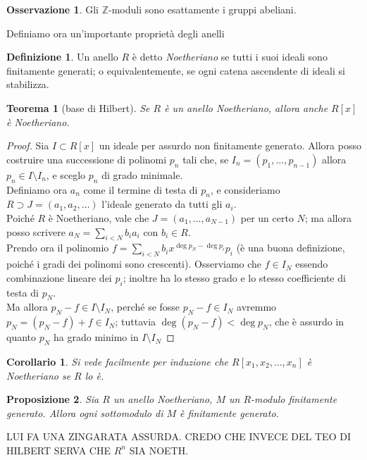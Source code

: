 \documentclass[11pt]{article}
\theoremstyle{plain}
\newtheorem{thm}{Teorema}[section]
\newtheorem{prop}[thm]{Proposizione}
\newtheorem*{cor}{Corollario}
\theoremstyle{definition}
\newtheorem{defn}{Definizione}[section]
\newtheorem*{rem}{Osservazione}
\theoremstyle{remark}
\newcommand{\Z}{\mathbb{Z}}
\begin{document}
  \begin{rem}
   Gli $\Z$-moduli sono esattamente i gruppi abeliani.
  \end{rem}
  Definiamo ora un'importante proprietà degli anelli
  \begin{defn}
   Un anello $R$ è detto \textit{Noetheriano} se tutti i suoi ideali sono finitamente generati; o equivalentemente, se ogni catena ascendente di ideali si stabilizza.
  \end{defn}
  \begin{thm}[base di Hilbert]
   Se $R$ è un anello Noetheriano, allora anche $R[x]$ è Noetheriano.
  \end{thm}
  \begin{proof}
   Sia $I\subset R[x]$ un ideale per assurdo non finitamente generato. Allora posso costruire una successione di polinomi $p_n$ tali che, se $I_n=(p_1,\dots,p_{n-1})$ allora $p_n\in I\setminus I_n$, e sceglo $p_n$ di grado minimale.\\
   Definiamo ora $a_n$ come il termine di testa di $p_n$, e consideriamo $R\supset J=(a_1,a_2,\dots)$ l'ideale generato da tutti gli $a_i$.\\
   Poiché $R$ è Noetheriano, vale che $J=(a_1,\dots,a_{N-1})$ per un certo $N$; ma allora posso scrivere $a_N=\sum_{i<N}b_ia_i$ con $b_i\in R$.\\
   Prendo ora il polinomio $\displaystyle f=\sum_{i<N}b_i x^{\deg p_N -\deg p_i}p_i$ (è una buona definizione, poiché i gradi dei polinomi sono crescenti).
   Osserviamo che $f\in I_N$ essendo combinazione lineare dei $p_i$; inoltre ha lo stesso grado e lo stesso coefficiente di testa di $p_N$.\\
   Ma allora $p_N-f\in I\setminus I_N$, perché se fosse $p_N-f\in I_N$ avremmo $p_N=(p_N-f)+f\in I_N$; tuttavia $\deg (p_N-f)<\deg p_N$, che è assurdo in quanto $p_N$ ha grado minimo in $I\setminus I_N$
  \end{proof}
  \begin{cor}
   Si vede facilmente per induzione che $R[x_1,x_2,\dots,x_n]$ è Noetheriano se $R$ lo è.
  \end{cor}
  \begin{prop}\label{sottomod_fin_gen}
   Sia $R$ un anello Noetheriano, $M$ un $R$-modulo finitamente generato. Allora ogni sottomodulo di $M$ è finitamente generato.
  \end{prop}
  LUI FA UNA ZINGARATA ASSURDA. CREDO CHE INVECE DEL TEO DI HILBERT SERVA CHE $R^n$ SIA NOETH.
\end{document}
